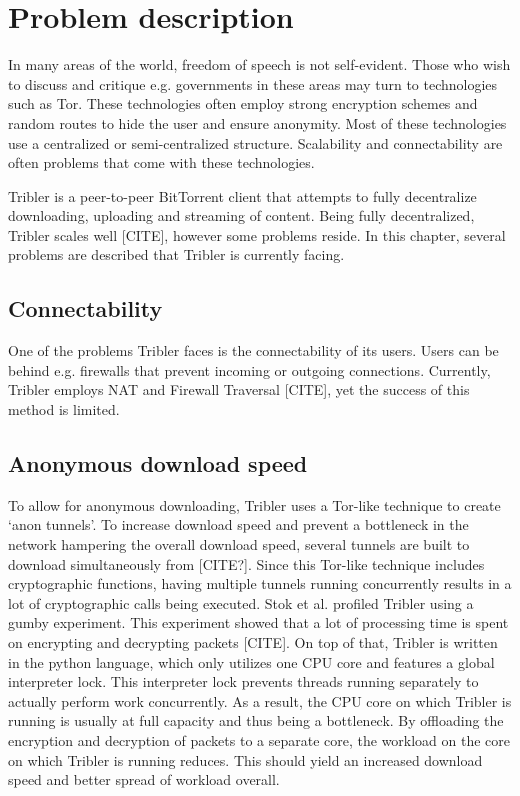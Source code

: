 \chapter{Problem description}
In many areas of the world, freedom of speech is not self-evident.
Those who wish to discuss and critique e.g. governments in these areas may turn to technologies such as Tor.
These technologies often employ strong encryption schemes and random routes to hide the user and ensure anonymity.
Most of these technologies use a centralized or semi-centralized structure.
Scalability and connectability are often problems that come with these technologies.

Tribler is a peer-to-peer BitTorrent client that attempts to fully decentralize downloading, uploading and streaming of content.
Being fully decentralized, Tribler scales well [CITE], however some problems reside.
In this chapter, several problems are described that Tribler is currently facing.


\section{Connectability}
One of the problems Tribler faces is the connectability of its users.
Users can be behind e.g. firewalls that prevent incoming or outgoing connections.
Currently, Tribler employs NAT and Firewall Traversal [CITE], yet the success of this method is limited.

\section{Anonymous download speed}
To allow for anonymous downloading, Tribler uses a Tor-like technique to create `anon tunnels'.
To increase download speed and prevent a bottleneck in the network hampering the overall download speed, several tunnels are built to download simultaneously from [CITE?].
Since this Tor-like technique includes cryptographic functions, having multiple tunnels running concurrently results in a lot of cryptographic calls being executed.
Stok et al. profiled Tribler using a gumby experiment. This experiment showed that a lot of processing time is spent on encrypting and decrypting packets [CITE].
On top of that, Tribler is written in the python language, which only utilizes one CPU core and features a global interpreter lock.
This interpreter lock prevents threads running separately to actually perform work concurrently.
As a result, the CPU core on which Tribler is running is usually at full capacity and thus being a bottleneck.
By offloading the encryption and decryption of packets to a separate core, the workload on the core on which Tribler is running reduces.
This should yield an increased download speed and better spread of workload overall.

